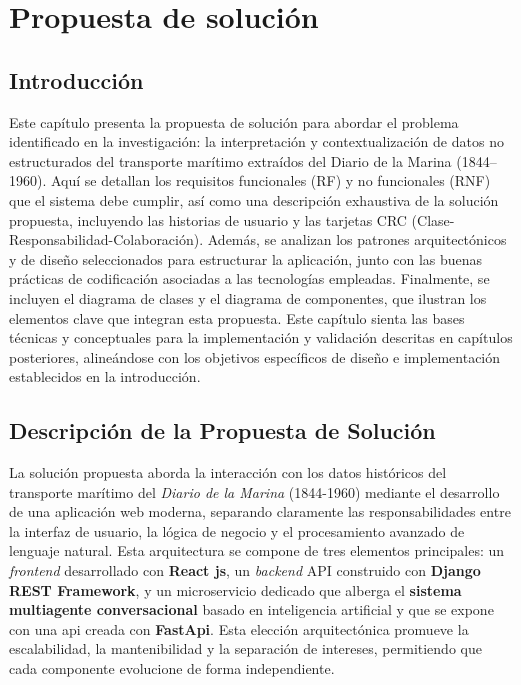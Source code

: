 \chapter{Propuesta de solución}
\label{chap:chapter2}

\section*{Introducción}
Este capítulo presenta la propuesta de solución para abordar el problema identificado en la investigación: la interpretación y contextualización de datos no estructurados del transporte marítimo extraídos del Diario de la Marina (1844–1960). Aquí se detallan los requisitos funcionales (RF) y no funcionales (RNF) que el sistema debe cumplir, así como una descripción exhaustiva de la solución propuesta, incluyendo las historias de usuario y las tarjetas CRC (Clase-Responsabilidad-Colaboración). Además, se analizan los patrones arquitectónicos y de diseño seleccionados para estructurar la aplicación, junto con las buenas prácticas de codificación asociadas a las tecnologías empleadas. Finalmente, se incluyen el diagrama de clases y el diagrama de componentes, que ilustran los elementos clave que integran esta propuesta. Este capítulo sienta las bases técnicas y conceptuales para la implementación y validación descritas en capítulos posteriores, alineándose con los objetivos específicos de diseño e implementación establecidos en la introducción.

\section{Descripción de la Propuesta de Solución}
\label{sec:propuesta_solucion}

La solución propuesta aborda la interacción con los datos históricos del transporte marítimo del \textit{Diario de la Marina} (1844-1960) mediante el desarrollo de una aplicación web moderna, separando claramente las responsabilidades entre la interfaz de usuario, la lógica de negocio y el procesamiento avanzado de lenguaje natural. Esta arquitectura se compone de tres elementos principales: un \textit{frontend} desarrollado con \textbf{React js}, un \textit{backend} API construido con \textbf{Django REST Framework}, y un microservicio dedicado que alberga el \textbf{sistema multiagente conversacional} basado en inteligencia artificial y que se expone con una api creada con \textbf{FastApi}. Esta elección arquitectónica promueve la escalabilidad, la mantenibilidad y la separación de intereses, permitiendo que cada componente evolucione de forma independiente.


